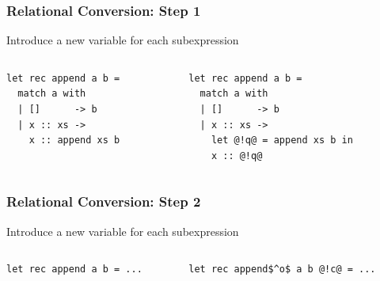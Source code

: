 \documentclass[xcolor=table]{beamer}
\begin{document}
\begin{frame}[fragile]
  \transwipe[direction=90]
  \frametitle{Relational Conversion: Step 1}
  
Introduce a new variable for each subexpression

\begin{columns}
\begin{column}{0.5\textwidth}
\begin{lstlisting}
let rec append a b =
  match a with
  | []      -> b
  | x :: xs -> 
    x :: append xs b
\end{lstlisting}
\end{column}
\begin{column}{0.5\textwidth}  
\begin{lstlisting}
let rec append a b =
  match a with 
  | []      -> b
  | x :: xs -> 
    let @!q@ = append xs b in
    x :: @!q@
\end{lstlisting}
\end{column}
\end{columns}
\end{frame}


\begin{frame}[fragile]
  \transwipe[direction=90]
  \frametitle{Relational Conversion: Step 2}
  
Introduce a new variable for each subexpression

\begin{columns}
\begin{column}{0.5\textwidth}
\begin{lstlisting}
let rec append a b = ...
\end{lstlisting}
\end{column}
\begin{column}{0.5\textwidth}  
\begin{lstlisting}
let rec append$^o$ a b @!c@ = ...
\end{lstlisting}
\end{column}
\end{columns}  
\end{frame}
\end{document}
